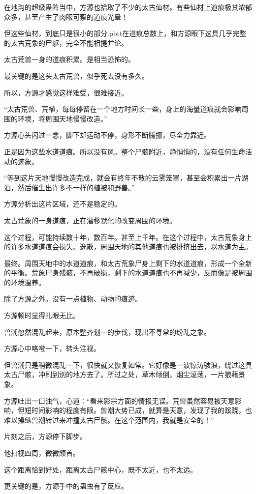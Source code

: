 \begin{this_body}
在地沟的超级蛊阵当中，方源也拾取了不少的太古仙材。有些仙材上道痕极其浓郁众多，甚至产生了肉眼可察的道痕光晕！

但这些仙材，到底只是很小的部分.pbtt在道痕总数上，和方源眼下这具几乎完整的太古荒象的尸躯，完全不能相提并论。

太古荒兽一身的道痕积累。是相当恐怖的。

最关键的是这头太古荒兽，似乎死去没有多久。

所以，方源才感觉这样难受，很难接近。

“太古荒兽、荒植，每每停留在一个地方时间长一些，身上的海量道痕就会影响周围的环境，将周围天地慢慢改造。”

方源心头闪过一念，脚下却运动不停，身形不断腾挪，尽全力靠近。

正是因为这些水道道痕。所以没有风。整个尸骸附近，静悄悄的，没有任何生命活动的迹象。

“等到这片天地慢慢改造完成，就会有终年不散的云雾笼罩，甚至会积累出一片湖泊，然后催生出许多不一样的植被和野兽。”

方源分析出这片区域，还不是稳定的。

太古荒象的一身道痕，正在潜移默化的改变周围的环境。

这个过程，可能持续数十年，数百年。甚至上千年。在这个过程中，太古荒象身上的许多水道道痕会损失、逸散，周围天地的其他道痕也被排挤出去，以水道为主。

最终。周围天地中的水道道痕，和太古荒象尸身上剩下的水道道痕，形成一个全新的平衡。荒象尸身残骸，不再破损，剩下的水道道痕也不再减少，反而像是被周围的环境温养。

除了方源之外。没有一点植物、动物的痕迹。

方源顿时显得扎眼无比。

兽潮忽然混乱起来，原本整齐划一的步伐，现出不寻常的纷乱之象。

方源心中咯噔一下，转头注视。

但兽潮只是稍微混乱一下，很快就又恢复如常。它好像是一波惊涛骇浪，绕过这具太古尸骸，冲刷到别的地方去了。所过之处，草木倾倒，烟尘滚荡，一片狼藉景象。

方源吐出一口浊气，心道：“看来影宗方面的情报无误。荒兽虽然容易被天意影响，但短时间影响的程度有限。兽潮大势已成，就算是天意，发现了我的蹊跷，也难以操纵兽潮转过来冲撞太古尸骸。在这个范围内，我就是安全的！”

片刻之后，方源停下脚步。

他扫视四周，微微颔首。

这个距离恰到好处，距离太古尸骸中心，既不太近，也不太远。

更关键的是，方源手中的蛊虫有了反应。


\end{this_body}
